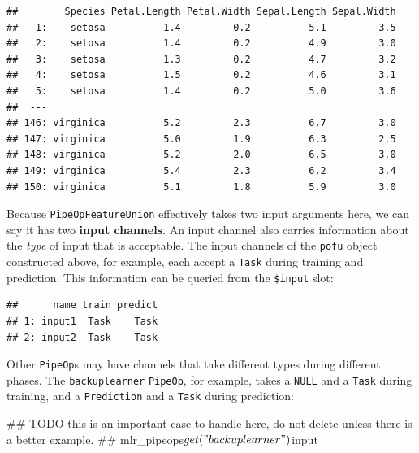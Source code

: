\documentclass[]{scrbook}
\newenvironment{Shaded}{\begin{snugshade}}{\end{snugshade}}
\newcommand{\AlertTok}[1]{\textcolor[rgb]{0.94,0.16,0.16}{#1}}
\newcommand{\NormalTok}[1]{#1}
\newcommand{\OperatorTok}[1]{\textcolor[rgb]{0.81,0.36,0.00}{\textbf{#1}}}
\renewenvironment{Shaded} {\begin{snugshade}\small} {\end{snugshade}}
\begin{document}
\begin{verbatim}
##        Species Petal.Length Petal.Width Sepal.Length Sepal.Width
##   1:    setosa          1.4         0.2          5.1         3.5
##   2:    setosa          1.4         0.2          4.9         3.0
##   3:    setosa          1.3         0.2          4.7         3.2
##   4:    setosa          1.5         0.2          4.6         3.1
##   5:    setosa          1.4         0.2          5.0         3.6
##  ---                                                            
## 146: virginica          5.2         2.3          6.7         3.0
## 147: virginica          5.0         1.9          6.3         2.5
## 148: virginica          5.2         2.0          6.5         3.0
## 149: virginica          5.4         2.3          6.2         3.4
## 150: virginica          5.1         1.8          5.9         3.0
\end{verbatim}

Because \texttt{PipeOpFeatureUnion} effectively takes two input arguments here, we can say it has two \textbf{input channels}.
An input channel also carries information about the \emph{type} of input that is acceptable.
The input channels of the \texttt{pofu} object constructed above, for example, each accept a \texttt{Task} during training and prediction.
This information can be queried from the \texttt{\$input} slot:

\begin{Shaded}
\end{Shaded}

\begin{verbatim}
##      name train predict
## 1: input1  Task    Task
## 2: input2  Task    Task
\end{verbatim}

Other \texttt{PipeOp}s may have channels that take different types during different phases.
The \texttt{backuplearner} \texttt{PipeOp}, for example, takes a \texttt{NULL} and a \texttt{Task} during training, and a \texttt{Prediction} and a \texttt{Task} during prediction:

\begin{Shaded}
\begin{Highlighting}[]
\NormalTok{## }\AlertTok{TODO}\NormalTok{ this is an important case to handle here, do not delete unless there is a better example.}
\NormalTok{## mlr_pipeops$get("backuplearner")$input}
\end{Highlighting}
\end{Shaded}
\end{document}
